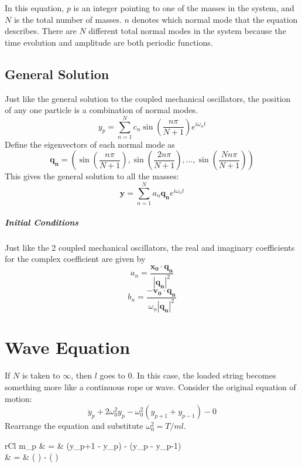 \documentclass[11pt]{article}
\begin{document}
		In this equation, $p$ is an integer pointing to one of the masses in the system, and $N$ is the total number of masses. $n$ denotes which normal mode that the equation describes. There are $N$ different total normal modes in the system because the time evolution and amplitude are both periodic functions.
		
	\subsection{General Solution}
		Just like the general solution to the coupled mechanical oscillators, the position of any one particle is a combination of normal modes.
		\begin{equation}
			y_p = \sum_{n=1}^N c_n \sin\left(\frac{n\pi}{N+1}\right) e^{i\omega_n t}
		\end{equation}
		Define the eigenvectors of each normal mode as
		\begin{equation}
			\mathbf{q_n} = \left( \sin \left(\frac{n\pi}{N+1}\right), \sin \left(\frac{2n\pi}{N+1}\right), \ldots , \sin \left(\frac{Nn\pi}{N+1}\right) \right)
		\end{equation}
		This gives the general solution to all the masses:
		\begin{equation}
			\mathbf{y} = \sum_{n=1}^N a_n \mathbf{q_n} e^{i\omega_n t}
		\end{equation}
		
		\subparagraph{Initial Conditions} Just like the 2 coupled mechanical oscillators, the real and imaginary coefficients for the complex coefficient are given by 
			\begin{equation}
				a_n = \frac{\mathbf{x_0} \cdot \mathbf{q_n}}{|\mathbf{q_n}|^2}
			\end{equation}
			\begin{equation}
				b_n = \frac{-\mathbf{v_0} \cdot \mathbf{q_n}}{\omega_n |\mathbf{q_n}|^2}
			\end{equation}
		
\section{Wave Equation}
	If $N$ is taken to $\infty$, then $l$ goes to 0. In this case, the loaded string becomes something more like a continuous rope or wave. Consider the original equation of motion:
	\begin{equation}
		\ddot{y}_p + 2\omega_0^2 y_p - \omega_0^2(y_{p+1} + y_{p-1}) - 0
	\end{equation}
	Rearrange the equation and substitute $\omega_0^2 = T/ml$.
	\begin{IEEEeqnarray}{rCl}
		m_p & = & (y_{p+1} - y_p) - (y_p - y_{p-1})\\
		 & = &  \left(  \right) - \left(  \right)
	\end{IEEEeqnarray}
	
\end{document}
